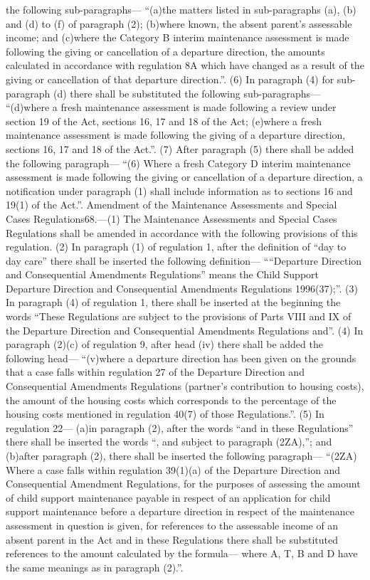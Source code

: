 \documentclass[a4paper]{article}
\begin{document}
the following sub-paragraphs—
“(a)the matters listed in sub-paragraphs (a), (b) and (d) to (f) of paragraph
(2);
(b)where known, the absent parent’s assessable income; and
(c)where the Category B interim maintenance assessment is made following the
giving or cancellation of a departure direction, the amounts calculated in
accordance with regulation 8A which have changed as a result of the giving or
cancellation of that departure direction.”.
(6) In paragraph (4) for sub-paragraph (d) there shall be substituted the
following sub-paragraphs—
“(d)where a fresh maintenance assessment is made following a review under
section 19 of the Act, sections 16, 17 and 18 of the Act;
(e)where a fresh maintenance assessment is made following the giving of a
departure direction, sections 16, 17 and 18 of the Act.”.
(7) After paragraph (5) there shall be added the following paragraph—
“(6) Where a fresh Category D interim maintenance assessment is made following
the giving or cancellation of a departure direction, a notification under
paragraph (1) shall include information as to sections 16 and 19(1) of the
Act.”.
Amendment of the Maintenance Assessments and Special Cases Regulations68.—(1)
The Maintenance Assessments and Special Cases Regulations shall be amended in
accordance with the following provisions of this regulation.
(2) In paragraph (1) of regulation 1, after the definition of “day to day care”
there shall be inserted the following definition—
““Departure Direction and Consequential Amendments Regulations” means the Child
Support Departure Direction and Consequential Amendments Regulations 1996(37);”.
(3) In paragraph (4) of regulation 1, there shall be inserted at the beginning
the words “These Regulations are subject to the provisions of Parts VIII and IX
of the Departure Direction and Consequential Amendments Regulations and”.
(4) In paragraph (2)(c) of regulation 9, after head (iv) there shall be added
the following head—
“(v)where a departure direction has been given on the grounds that a case falls
within regulation 27 of the Departure Direction and Consequential Amendments
Regulations (partner’s contribution to housing costs), the amount of the housing
costs which corresponds to the percentage of the housing costs mentioned in
regulation 40(7) of those Regulations.”.
(5) In regulation 22—
(a)in paragraph (2), after the words “and in these Regulations” there shall be
inserted the words “, and subject to paragraph (2ZA),”; and
(b)after paragraph (2), there shall be inserted the following paragraph—
“(2ZA) Where a case falls within regulation 39(1)(a) of the Departure Direction
and Consequential Amendment Regulations, for the purposes of assessing the
amount of child support maintenance payable in respect of an application for
child support maintenance before a departure direction in respect of the
maintenance assessment in question is given, for references to the assessable
income of an absent parent in the Act and in these Regulations there shall be
substituted references to the amount calculated by the formula—
where A, T, B and D have the same meanings as in paragraph (2).”.
\end{document}
